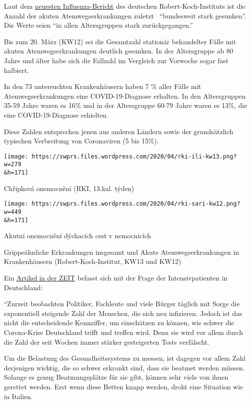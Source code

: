 Laut dem
\href{https://influenza.rki.de/Wochenberichte/2019_2020/2020-13.pdf}{neuesten
Influenza-Bericht} des deutschen Robert-Koch-Instituts ist die Anzahl
der akuten Atemwegs­erkrankungen zuletzt~ ``bundesweit stark gesunken''.
Die Werte seien ``in allen Altersgruppen stark zurückgegangen.''

Bis zum 20. März (KW12) sei die Gesamtzahl stationär behandelter Fälle
mit akuten Atemwegs­erkrankungen deutlich gesunken. In der Altersgruppe
ab 80 Jahre und älter habe sich die Fallzahl im Vergleich zur Vorwoche
sogar fast halbiert.

In den 73 untersuchten Krankenhäusern haben 7 \% aller Fälle mit
Atemwegserkrankungen eine COVID-19-Diagnose erhalten. In den
Altersgruppen 35-59 Jahre waren es 16\% und in der Altersgruppe 60-79
Jahre waren es 13\%, die eine COVID-19-Diagnose erhielten.

Diese Zahlen entsprechen jenen aus anderen Ländern sowie der
grundsätzlich typischen Verbreitung von Coronaviren (5 bis 15\%).

\href{https://swprs.files.wordpress.com/2020/04/rki-ili-kw13.png}{}

\texttt{[image: https://swprs.files.wordpress.com/2020/04/rki-ili-kw13.png?w=279\\\&h=171]}

Chřipková onemocnění (RKI, 13.kal. týden)

\href{https://swprs.files.wordpress.com/2020/04/rki-sari-kw12.png}{}

\texttt{[image: https://swprs.files.wordpress.com/2020/04/rki-sari-kw12.png?w=449\\\&h=171]}

Akutní onemocnění dýchacích cest v nemocnicích

Grippeähnliche Erkrankungen insgesamt und Akute Atemwegserkrankungen in
Krankenhäusern (Robert-Koch-Institut, KW13 und KW12)

Ein
\href{https://www.zeit.de/wissen/2020-04/krankenhaeuser-kapazitaeten-coronavirus-patienten-deutschland/seite-2}{Artikel
in der ZEIT} befasst sich mit der Frage der Intensivpatienten in
Deutschland:

``Zurzeit beobachten Politiker, Fachleute und viele Bürger täglich mit
Sorge die exponentiell steigende Zahl der Menschen, die sich neu
infizieren. Jedoch ist das nicht die entscheidende Kennziffer, um
einschätzen zu können, wie schwer die Corona-Krise Deutschland trifft
und treffen wird. Denn sie wird vor allem durch die Zahl der seit Wochen
immer stärker gesteigerten Tests verfälscht.

Um die Belastung des Gesundheitssystems zu messen, ist dagegen vor allem
Zahl derjenigen wichtig, die so schwer erkrankt sind, dass sie beatmet
werden müssen. Solange es genug Beatmungsplätze für sie gibt, können
sehr viele von ihnen gerettet werden. Erst wenn diese Betten knapp
werden, droht eine Situation wie in Italien.

